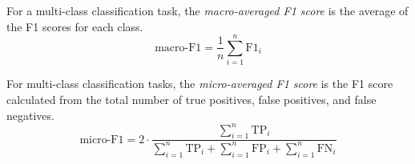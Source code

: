 \begin{definition}
    For a multi-class classification task, the \textit{macro-averaged F1 score} is the average of the F1 scores for each class.
    $$
    \text{macro-F1} = \frac{1}{n} \sum_{i=1}^{n} \text{F1}_i
    $$
\end{definition}

\begin{definition}
    For multi-class classification tasks, the \textit{micro-averaged F1 score} is the F1 score calculated from the total number of true positives, false positives, and false negatives.
    $$
    \text{micro-F1} = 2 \cdot \frac{\sum_{i=1}^{n} \text{TP}_i}{\sum_{i=1}^{n} \text{TP}_i + \sum_{i=1}^{n} \text{FP}_i + \sum_{i=1}^{n} \text{FN}_i}
    $$
\end{definition}